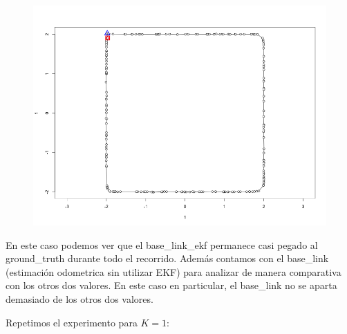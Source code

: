 \begin{figure}[!htb]
\begin{center}
\includegraphics[width=\linewidth/2]{imagenesTrayectorias/ekf/ekf04.png}
\end{center}
\end{figure}
\FloatBarrier


En este caso podemos ver que el base\_link\_ekf permanece casi pegado al ground\_truth durante todo el recorrido. Además contamos con el base\_link (estimación odometrica sin utilizar EKF) para analizar de manera comparativa con los otros dos valores. En este caso en particular, el base\_link no se aparta demasiado de los otros dos valores.

Repetimos el experimento para $K=1$:

